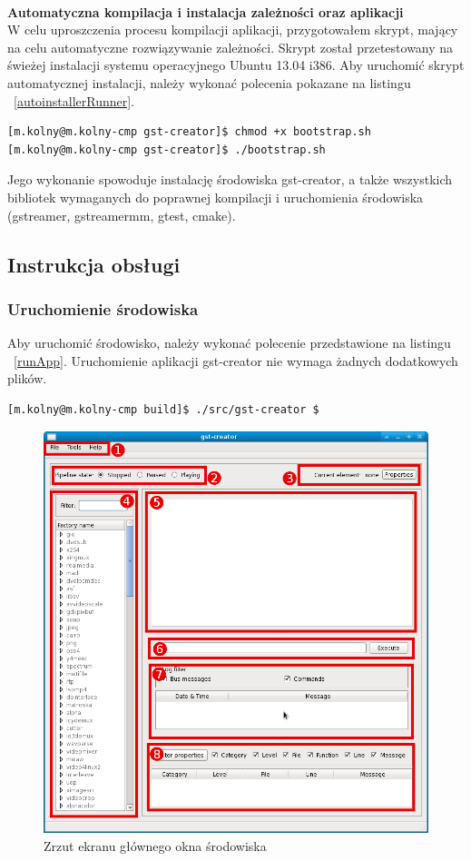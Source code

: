 \documentclass[12pt]{article}
\begin{document}
\paragraph{}
\textbf{Automatyczna kompilacja i instalacja zależności oraz aplikacji}\\
W celu uproszczenia procesu kompilacji aplikacji, przygotowałem skrypt, mający na celu automatyczne rozwiązywanie zależności. Skrypt został przetestowany na świeżej instalacji systemu operacyjnego Ubuntu 13.04 i386. Aby uruchomić skrypt automatycznej instalacji, należy wykonać polecenia pokazane na listingu ~\ref{autoinstallerRunner}.
\begin{lstlisting}[caption=Uruchomienie skryptu autoinstalatora, label=autoinstallerRunner]
[m.kolny@m.kolny-cmp gst-creator]$ chmod +x bootstrap.sh
[m.kolny@m.kolny-cmp gst-creator]$ ./bootstrap.sh
\end{lstlisting}
Jego wykonanie spowoduje instalację środowiska gst-creator, a także wszystkich bibliotek wymaganych do poprawnej kompilacji i uruchomienia środowiska (gstreamer, gstreamermm, gtest, cmake).
\subsection{Instrukcja obsługi}
\subsubsection{Uruchomienie środowiska}
Aby uruchomić środowisko, należy wykonać polecenie przedstawione na listingu ~\ref{runApp}. Uruchomienie aplikacji gst-creator nie wymaga żadnych dodatkowych plików.
\begin{lstlisting}[caption=Uruchomienie aplikacji, label=runApp]
[m.kolny@m.kolny-cmp build]$ ./src/gst-creator $
\end{lstlisting} 
\begin{figure}[H]
  \includegraphics[width=155mm]{img/main-window.png}
  \caption{Zrzut ekranu głównego okna środowiska}
  \label{fig:mainWindow}
\end{figure}
\end{document}
